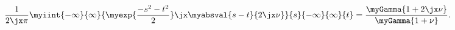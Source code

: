   \begin{equation}
      \frac{1}{2\jx\pi}\myiint{-\infty}{\infty}
      {\myexp{\frac{-s^2-t^2}{2}}\jx\myabsval{s-t}{2\jx\nu}}
      {s}{-\infty}{\infty}{t}
    =
    \frac{\myGamma{1+2\jx\nu}}{\myGamma{1+\nu}} 
	  .\label{eqn:mehSpec}
  \end{equation}

